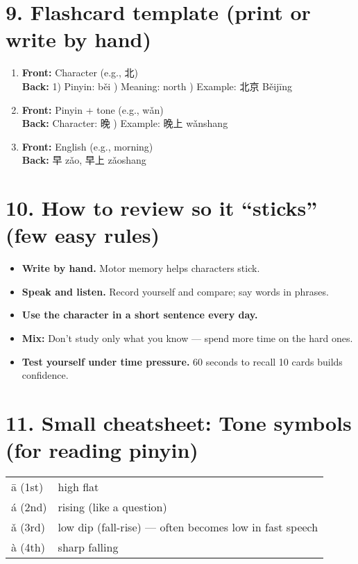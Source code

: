 \documentclass[12pt]{article}
\begin{document}
\begin{CJK}{UTF8}{gbsn}
\section*{9. Flashcard template (print or write by hand)}
\begin{multicols}{2}
\begin{enumerate}[leftmargin=*]
  \item \textbf{Front:} Character (e.g., 北) \\
        \textbf{Back:} 1) Pinyin: běi ) Meaning: north ) Example: 北京 Běijīng
  \item \textbf{Front:} Pinyin + tone (e.g., wǎn) \\
        \textbf{Back:} Character: 晚 ) Example: 晚上 wǎnshang
  \item \textbf{Front:} English (e.g., morning) \\
        \textbf{Back:} 早 zǎo, 早上 zǎoshang
\end{enumerate}
\end{multicols}

\section*{10. How to review so it ``sticks'' (few easy rules)}
\begin{itemize}
  \item \textbf{Write by hand.} Motor memory helps characters stick.
  \item \textbf{Speak and listen.} Record yourself and compare; say words in phrases.
  \item \textbf{Use the character in a short sentence every day.}
  \item \textbf{Mix:} Don’t study only what you know — spend more time on the hard ones.
  \item \textbf{Test yourself under time pressure.} 60 seconds to recall 10 cards builds confidence.
\end{itemize}

\section*{11. Small cheatsheet: Tone symbols (for reading pinyin)}
\begin{tabular}{ll}
ā (1st) & high flat \\
á (2nd) & rising (like a question) \\
ǎ (3rd) & low dip (fall-rise) — often becomes low in fast speech \\
à (4th) & sharp falling \\
\end{tabular}


\end{CJK}
\end{document}
